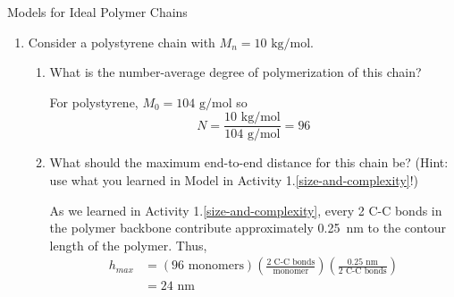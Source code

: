 \begin{activity}{Models for Ideal Polymer Chains}
\begin{exercises}
\begin{enumerate}
				\begin{solution}{}
					In CTQ \ref{\labelbase:ctq:statseg}, we wrote
					\begin{equation*}
						\langle h^2 \rangle = Nb^2
					\end{equation*}
					Combining this with the expression from CTQ \ref{\labelbase:ctq:C}, we obtain
					\begin{equation*}
						C_\infty n l^2 = Nb^2
					\end{equation*}
					From the previous part of this question, we also know that $h_{max} = Nb$, so
					\begin{align*}
						C_\infty n l^2 &= h_{max} b\\
						b & = \frac{C_\infty n l^2}{h_{max}}
					\end{align*}
					Finally, we can solve for $N$ using
					\begin{align*}
						N &= \frac{h_{max}}{b}\\
						&= \frac{h_{max}^2}{C_\infty n l^2}
					\end{align*}
				\end{solution}
			
			\item Consider a polystyrene chain with $M_n=10\text{ kg/mol}$.
			
				\begin{enumerate}
					\item What is the number-average degree of polymerization of this chain?
				
				\begin{solution}{}
					For polystyrene, $M_0=104\text{ g/mol}$ so
					\begin{equation*}
						N = \frac{10\text{ kg/mol}}{104\text{ g/mol}} = 96
					\end{equation*}
				\end{solution}
				
					\item What should the maximum end-to-end distance for this chain be?  (Hint: use what you learned in Model \label{size-and-complexity:mdl:polyethylenesize} in Activity 1.\ref{size-and-complexity}!)
				
				\begin{solution}{}
					As we learned in Activity 1.\ref{size-and-complexity}, every 2 C-C bonds in the polymer backbone contribute approximately 0.25~nm to the contour length of the polymer. Thus,
					\begin{align*}
						h_{max} &= (96\text{ monomers})\left(\frac{2\text{ C-C bonds}}{\text{monomer}}\right)\left(\frac{0.25\text{ nm}}{2\text{ C-C bonds}}\right)\\
						&= 24\text{ nm}
					\end{align*}
				\end{solution}
					

\end{enumerate}
\end{enumerate}
\end{exercises}
\end{activity}
